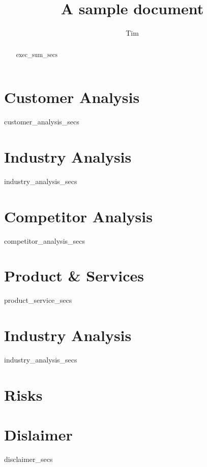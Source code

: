 \documentclass[11pt]{article}
\title{A sample document}
\author{Tim}
\begin{document}
\maketitle
\date

\newpage
\renewcommand{\abstractname}{Executive Summary}

\begin{abstract}
{{ exec_sum_secs }}
\end{abstract}

\newpage
\tableofcontents

\newpage{}
\section{Customer Analysis}
{{ customer_analysis_secs }}

\newpage{}
\section{Industry Analysis}
{{ industry_analysis_secs }}

\newpage{}
\section{Competitor Analysis}
{{ competitor_analysis_secs }}

\newpage{}
\section{Product \& Services}
{{ product_service_secs }}

\newpage{}
\section{Industry Analysis}
{{ industry_analysis_secs }}

\newpage{}
\section{Risks}

\newpage{}
\section{Dislaimer}
{{ disclaimer_secs }}
\end{document}
